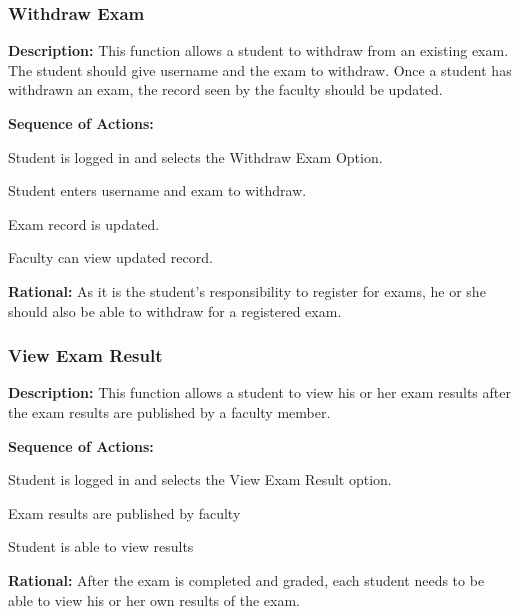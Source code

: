    \subsubsection{\large Withdraw Exam} 
   \begin{boxed} %
      \textbf{Description:}
      {\small This function allows a student to withdraw from an existing exam. The
         student should give username and the exam to withdraw. Once a
         student has withdrawn an exam, the record seen by the faculty should
         be updated.}
         
         \textbf{Sequence of Actions:}
         \begin{enumerate}
               {\small
            \item Student is logged in and selects the Withdraw Exam Option.
            \item Student enters username and exam to withdraw.
            \item Exam record is updated.
            \item Faculty can view updated record.}
         \end{enumerate}

         \textbf{Rational:}
         {\small As it is the student's responsibility to register for exams, he or she
         should also be able to withdraw for a registered exam.}
   \end{boxed} %

   \subsubsection{\large View Exam Result} 
   \begin{boxed} %
      \textbf{Description:}
      {\small This function allows a student to view his or her exam results after
      the exam results are published by a faculty member.}
         
         \textbf{Sequence of Actions:}
         \begin{enumerate}
               {\small
            \item Student is logged in and selects the View Exam Result option.
            \item Exam results are published by faculty
            \item Student is able to view results}
         \end{enumerate}

         \textbf{Rational:}
         {\small After the exam is completed and graded, each student needs to
         be able to view his or her own results of the exam.}
   \end{boxed} %
